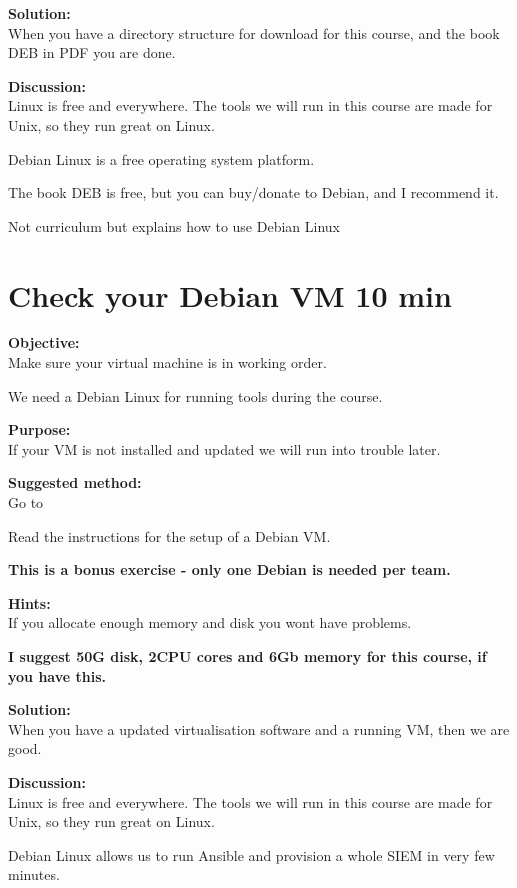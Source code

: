 \documentclass[a4paper,11pt,notitlepage]{report}
\begin{document}
{\bf Solution:}\\
When you have a directory structure for download for this course, and the book DEB in PDF you are done.

{\bf Discussion:}\\
Linux is free and everywhere. The tools we will run in this course are made for Unix, so they run great on Linux.

Debian Linux is a free operating system platform.

The book DEB is free, but you can buy/donate to Debian, and I recommend it.

Not curriculum but explains how to use Debian Linux


\chapter{Check your Debian VM 10 min}
\label{ex:sw-basicDebianVM}


{\bf Objective:}\\
Make sure your virtual machine is in working order.

We need a Debian Linux for running tools during the course.

{\bf Purpose:}\\
If your VM is not installed and updated we will run into trouble later.

{\bf Suggested method:}\\
Go to 

Read the instructions for the setup of a Debian VM.

{\Large \bf This is a bonus exercise - only one Debian is needed per team.}

{\bf Hints:}\\
If you allocate enough memory and disk you wont have problems.

{\bf I suggest 50G disk, 2CPU cores and 6Gb memory for this course, if you have this.}

{\bf Solution:}\\
When you have a updated virtualisation software and a running VM, then we are good.

{\bf Discussion:}\\
Linux is free and everywhere. The tools we will run in this course are made for Unix, so they run great on Linux.

Debian Linux allows us to run Ansible and provision a whole SIEM in very few minutes.
\end{document}
